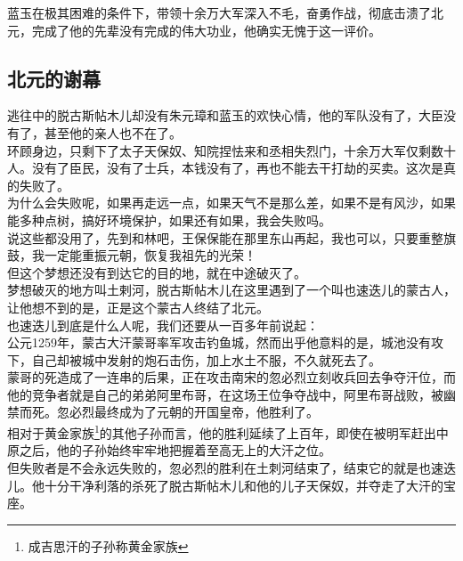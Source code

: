 \begin{multicols}{\theparacolNo}
蓝玉在极其困难的条件下，带领十余万大军深入不毛，奋勇作战，彻底击溃了北元，完成了他的先辈没有完成的伟大功业，他确实无愧于这一评价。\\

\subsection{北元的谢幕}
逃往中的脱古斯帖木儿却没有朱元璋和蓝玉的欢快心情，他的军队没有了，大臣没有了，甚至他的亲人也不在了。\\

环顾身边，只剩下了太子天保奴、知院捏怯来和丞相失烈门，十余万大军仅剩数十人。没有了臣民，没有了士兵，本钱没有了，再也不能去干打劫的买卖。这次是真的失败了。\\

为什么会失败呢，如果再走远一点，如果天气不是那么差，如果不是有风沙，如果能多种点树，搞好环境保护，如果还有如果，我会失败吗。\\

说这些都没用了，先到和林吧，王保保能在那里东山再起，我也可以，只要重整旗鼓，我一定能重振元朝，恢复我祖先的光荣！\\

但这个梦想还没有到达它的目的地，就在中途破灭了。\\

梦想破灭的地方叫土剌河，脱古斯帖木儿在这里遇到了一个叫也速迭儿的蒙古人，让他想不到的是，正是这个蒙古人终结了北元。\\

也速迭儿到底是什么人呢，我们还要从一百多年前说起：\\

公元1259年，蒙古大汗蒙哥率军攻击钓鱼城，然而出乎他意料的是，城池没有攻下，自己却被城中发射的炮石击伤，加上水土不服，不久就死去了。\\

蒙哥的死造成了一连串的后果，正在攻击南宋的忽必烈立刻收兵回去争夺汗位，而他的竞争者就是自己的弟弟阿里布哥，在这场王位争夺战中，阿里布哥战败，被幽禁而死。忽必烈最终成为了元朝的开国皇帝，他胜利了。\\

相对于黄金家族\footnote{成吉思汗的子孙称黄金家族}的其他子孙而言，他的胜利延续了上百年，即使在被明军赶出中原之后，他的子孙始终牢牢地把握着至高无上的大汗之位。\\

但失败者是不会永远失败的，忽必烈的胜利在土刺河结束了，结束它的就是也速迭儿。他十分干净利落的杀死了脱古斯帖木儿和他的儿子天保奴，并夺走了大汗的宝座。\\


\end{multicols}
